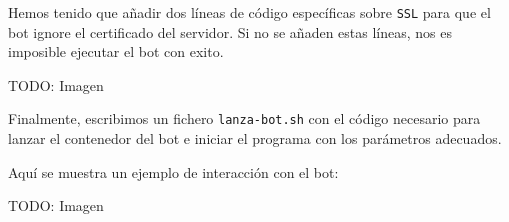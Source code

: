 Hemos tenido que añadir dos líneas de código específicas sobre \lstinline{SSL}
para que el bot ignore el certificado del servidor.
Si no se añaden estas líneas, nos es imposible ejecutar el bot con exito.

TODO: Imagen

Finalmente, escribimos un fichero \lstinline{lanza-bot.sh} con el código necesario
para lanzar el contenedor del bot e iniciar el programa con los parámetros adecuados.

Aquí se muestra un ejemplo de interacción con el bot:

TODO: Imagen
